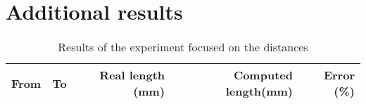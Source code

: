 \chapter{Additional results}

\begin{table}[h!]
\centering
\begin{tabular}{|r|r|r|r|r|}
\hline
From    & To    & Real length (mm) & Computed length(mm) & Error (\%) \\
\hline
\hline

\hline
\end{tabular}
\label{table:distances-second}
\caption{Results of the experiment focused on the distances}
\end{table}
